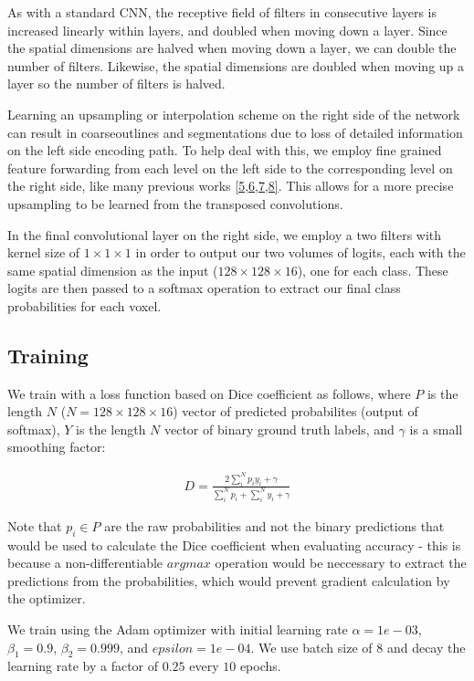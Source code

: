 \documentclass[11pt]{article}
\begin{document}
As with a standard CNN, the receptive field of filters in consecutive layers is increased linearly within layers, and doubled when moving down a layer. Since the spatial dimensions are halved when moving down a layer, we can double the number of filters. Likewise, the spatial dimensions are doubled when moving up a layer so the number of filters is halved.   

Learning an upsampling or interpolation scheme on the right side of the network can result in coarseoutlines and segmentations due to loss of detailed information on the left side encoding path. To help deal with this, we employ fine grained feature forwarding from each level on the left side to the corresponding level on the right side, like many previous works \hyperref[noh]{[5,6,7,8]}. This allows for a more precise upsampling to be learned from the transposed convolutions. 

In the final convolutional layer on the right side, we employ a two filters with kernel size of $1 \times 1 \times 1$ in order to output our two volumes of logits, each with the same spatial dimension as the input ($128 \times 128 \times 16$), one for each class. These logits are then passed to a softmax operation to extract our final class probabilities for each voxel. 

\subsection{Training}

We train with a loss function based on Dice coefficient as follows, where $P$ is the length $N$ ($N = 128 \times 128 \times 16$) vector of predicted probabilites (output of softmax), $Y$ is the length $N$ vector of binary ground truth labels, and $\gamma$ is a small smoothing factor:

\begin{align*}
D = \frac{2\sum_{i}^{N}p_iy_i + \gamma}{\sum_{i}^{N}p_i + \sum_{i}^{N}y_i + \gamma}
\end{align*}

Note that $p_i \in P$ are the raw probabilities and not the binary predictions that would be used to calculate the Dice coefficient when evaluating accuracy - this is because a non-differentiable $argmax$ operation would be neccessary to extract the predictions from the probabilities, which would prevent gradient calculation by the optimizer. 

We train using the Adam optimizer with initial learning rate $\alpha = 1e-03$, $\beta_1 = 0.9$, $\beta_2 = 0.999$, and $epsilon =1e-04$. We use batch size of $8$ and decay the learning rate by a factor of $0.25$ every $10$ epochs. 
\end{document}

